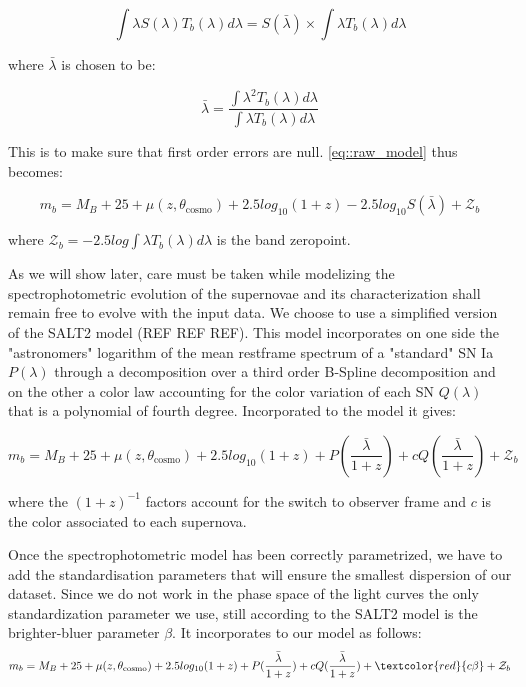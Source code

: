 \documentclass[\docopts]{\docclass}
\begin{document}
\begin{equation}
  \int \lambda S(\lambda) T_b(\lambda) d\lambda = S(\bar \lambda) \times \int \lambda T_b(\lambda) d\lambda
\end{equation}

where $\bar \lambda$ is chosen to be:

\begin{equation}
  \bar \lambda = \frac{\int \lambda^2 T_b(\lambda) d\lambda}{\int \lambda T_b(\lambda) d\lambda}
\end{equation}

This is to make sure that first order errors are null. \ref{eq::raw_model} thus becomes:
          
\begin{equation}
  m_b = M_B + 25 + \mu(z, \theta_\text{cosmo}) + 2.5log_{10}(1+z) - 2.5 log_{10} S(\bar \lambda) + \mathcal{Z}_b
\end{equation}

where $\mathcal{Z}_b = -2.5 log \int \lambda T_b(\lambda) d\lambda$ is the band zeropoint.

As we will show later, care must be taken while modelizing the spectrophotometric evolution of the supernovae and its characterization shall remain free to evolve with the input data.
We choose to use a simplified version of the SALT2 model (REF REF REF).
This model incorporates on one side the "astronomers" logarithm of the mean restframe spectrum of a "standard" SN Ia $P(\lambda)$ through a decomposition over a third order B-Spline decomposition and on the other a color law accounting for the color variation of each SN $Q(\lambda)$ that is a polynomial of fourth degree.
Incorporated to the model it gives:

\begin{equation}
m_b = M_B + 25 + \mu(z, \theta_\text{cosmo}) + 2.5log_{10}(1+z) + P(\frac{\bar \lambda}{1+z}) + cQ(\frac{\bar \lambda}{1+z})+ \mathcal{Z}_b
\end{equation}

where the $(1+z)^{-1}$ factors account for the switch to observer frame and $c$ is the color associated to each supernova.


Once the spectrophotometric model has been correctly parametrized, we have to add the standardisation parameters that will ensure the smallest dispersion of our dataset.
Since we do not work in the phase space of the light curves the only standardization parameter we use, still according to the SALT2 model is the brighter-bluer parameter $\beta$.
It incorporates to our model as follows:
\begin{equation}
\label{eq::model}
m_b = M_B + 25 + \mu(z, \theta_\text{cosmo}) + 2.5log_{10}(1+z) + P(\frac{\bar \lambda}{1+z}) + cQ(\frac{\bar \lambda}{1+z}) + \textcolor{red}{c\beta}+ \mathcal{Z}_b
\end{equation}
\end{document}
